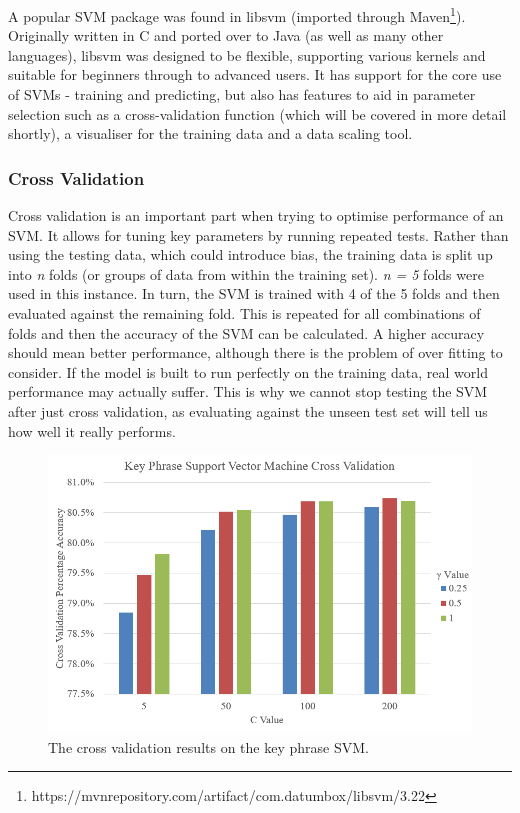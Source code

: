 A popular SVM package was found in libsvm (imported through Maven\footnote{https://mvnrepository.com/artifact/com.datumbox/libsvm/3.22}). Originally written in C and ported over to Java (as well as many other languages), libsvm was designed to be flexible, supporting various kernels and suitable for beginners through to advanced users. It has support for the core use of SVMs - training and predicting, but also has features to aid in parameter selection such as a cross-validation function (which will be covered in more detail shortly), a visualiser for the training data and a data scaling tool.


\subsubsection*{Cross Validation}
Cross validation is an important part when trying to optimise performance of an SVM. It allows for tuning key parameters by running repeated tests. Rather than using the testing data, which could introduce bias, the training data is split up into \textit{n} folds (or groups of data from within the training set). \textit{n = 5} folds were used in this instance. In turn, the SVM is trained with 4 of the 5 folds and then evaluated against the remaining fold. This is repeated for all combinations of folds and then the accuracy of the SVM can be calculated. A higher accuracy should mean better performance, although there is the problem of over fitting to consider. If the model is built to run perfectly on the training data, real world performance may actually suffer. This is why we cannot stop testing the SVM after just cross validation, as evaluating against the unseen test set will tell us how well it really performs. 

\begin{center}
	\begin{figure}
		\includegraphics[width=\textwidth]{img/kpsvmcrossvalidation.png}
		\caption[Key Phrase SVM Cross Validation]{The cross validation results on the key phrase SVM.}
		\label{figure:kpsvmcv}
	\end{figure}
\end{center}

